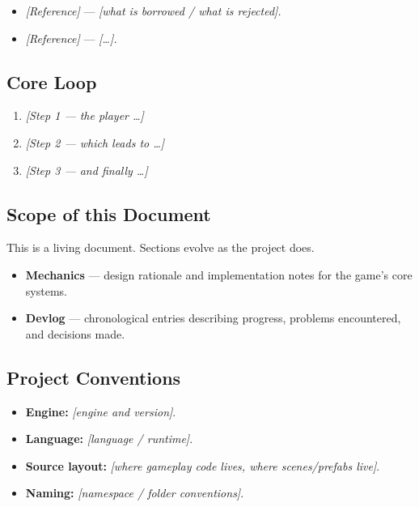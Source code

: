 \begin{itemize}
    \item \textit{[Reference]} --- \textit{[what is borrowed / what is rejected].}
    \item \textit{[Reference]} --- \textit{[\ldots].}
\end{itemize}

\subsection{Core Loop}


\begin{enumerate}
    \item \textit{[Step 1 --- the player \ldots]}
    \item \textit{[Step 2 --- which leads to \ldots]}
    \item \textit{[Step 3 --- and finally \ldots]}
\end{enumerate}

\subsection{Scope of this Document}

This is a living document. Sections evolve as the project does.

\begin{itemize}
    \item \textbf{Mechanics} --- design rationale and implementation
          notes for the game's core systems.
    \item \textbf{Devlog} --- chronological entries describing
          progress, problems encountered, and decisions made.
\end{itemize}

\subsection{Project Conventions}


\begin{itemize}
    \item \textbf{Engine:} \textit{[engine and version]}.
    \item \textbf{Language:} \textit{[language / runtime]}.
    \item \textbf{Source layout:} \textit{[where gameplay code lives,
          where scenes/prefabs live]}.
    \item \textbf{Naming:} \textit{[namespace / folder conventions]}.
\end{itemize}

\newpage
